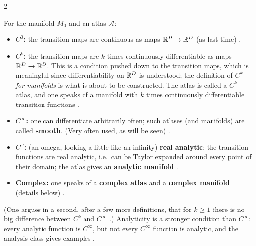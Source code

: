 \begin{paracol}{2}
\begin{definition}\label{def:df-ck}
For the manifold $M_0$ and an atlas $\mathcal A$:
\begin{itemize}
  \item \textbf{$C^0$:} the transition maps are continuous as maps $\mathbb{R}^D\to\mathbb{R}^D$ (as last time) .
  \item \textbf{$C^k$:} the transition maps are $k$ times continuously differentiable as maps $\mathbb{R}^D\to\mathbb{R}^D$. This is a condition pushed down to the transition maps, which is meaningful since differentiability on $\mathbb{R}^D$ is understood; the definition of $C^k$ \emph{for manifolds} is what
        is about to be constructed. The atlas is called a $C^k$ atlas, and one speaks of a manifold with $k$ times continuously differentiable transition functions .
  \item \textbf{$C^\infty$:} one can differentiate arbitrarily often; such atlases (and manifolds) are called \textbf{smooth}. (Very often used, as will be seen) .
  \item \textbf{$C^\omega$:} (an omega, looking a little like an infinity) \textbf{real analytic}: the transition functions are real analytic, i.e.\ can be Taylor expanded around every point of their domain; the atlas gives an \textbf{analytic manifold}
        .
  \item \textbf{Complex:} one speaks of a \textbf{complex atlas} and a \textbf{complex manifold} (details below) .
\end{itemize}
\end{definition}
(One argues in a second, after a few more definitions, that for $k\ge1$ there is no big difference between $C^k$ and $C^\infty$ .)
Analyticity is a stronger condition than $C^\infty$: every analytic function is $C^\infty$, but not every $C^\infty$ function is analytic, and the analysis class gives examples .


\end{paracol}
